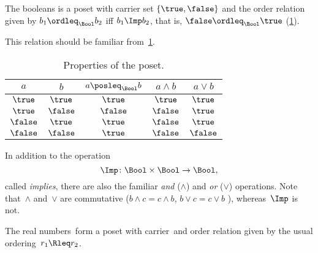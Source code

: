 \begin{example}[Booleans]
  \label{ex:bool}
  The booleans \index{\Bool} is a poset with carrier set $\{\true,\false\}$ and the order relation given by $b_1 \ordleq_\Bool b_2$ iff $b_1 \Imp b_2$, that is, $\false \ordleq_\Bool \true$ (\cref{fig:boolean}).

  \begin{figure}[h!]
    \centering
    \caption{}
    \label{fig:boolean}
  \end{figure}

  This relation should be familiar from~\cref{tab:boolposet}.

  \begin{table}[h!]
    \begin{center}
      \begin{tabular}{cc|ccc}
        $a$      & $b$      & $a \posleq_\Bool b$ & $a \wedge b$ & $a \vee b$ \\ \hline
        $\true$  & $\true$  & $\true$             & $\true$      & $\true$    \\
        $\true$  & $\false$ & $\false$            & $\false$     & $\true$    \\
        $\false$ & $\true$  & $\true$             & $\false$     & $\true$    \\
        $\false$ & $\false$ & $\true$             & $\false$     & $\false$
      \end{tabular}
    \end{center}
    \caption{Properties of the \Bool poset. \label{tab:boolposet}}
  \end{table}

  In addition to the operation
  \begin{equation*}
    \Imp\colon\Bool\times \Bool\to\Bool,
  \end{equation*}
  called \emph{implies}, there are also the familiar \emph{and} ($\wedge$) and \emph{or} ($\vee$) operations. Note that~$\wedge$ and~$\vee$ are commutative ($b\wedge c = c\wedge b$, $b\vee c = c\vee b$ ), whereas~$\Imp$ is not.
\end{example}




\begin{example}[Reals]
  The real numbers~\reals form a poset with carrier~\reals and order relation given by the usual ordering~$r_1 \Rleq r_2$.
\end{example}


